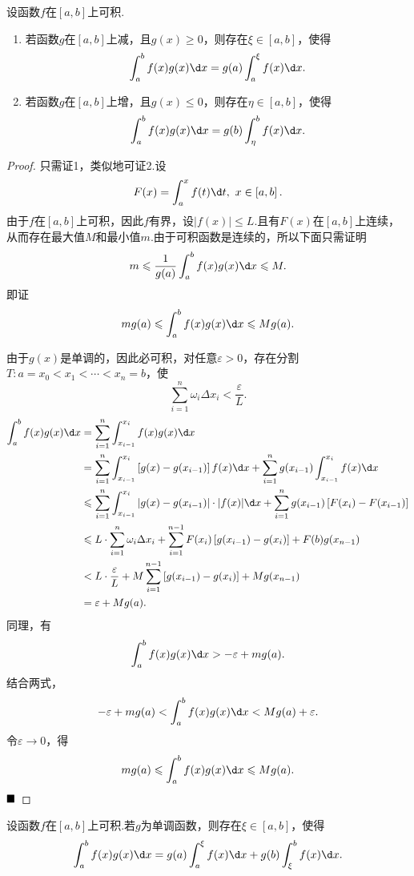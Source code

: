 \begin{theorem}[积分第二中值定理]
	设函数$f$在$\left[a,b\right]$上可积.
	\begin{enumerate}
		\item 若函数$g$在$\left[a,b\right]$上减，且$g(x)\geqslant 0$，则存在$\xi\in\left[a,b\right]$，使得
		$$\int_{a}^{b}f(x)g(x)\d x=g(a)\int_{a}^{\xi}f(x)\d x.$$
		\item 若函数$g$在$\left[a,b\right]$上增，且$g(x)\leqslant 0$，则存在$\eta\in\left[a,b\right]$，使得
		$$\int_{a}^{b}f(x)g(x)\d x=g(b)\int_{\eta}^{b}f(x)\d x.$$
	\end{enumerate}
\end{theorem}
\begin{proof}
	只需证1，类似地可证2.设
	$$F(x)=\int_{a}^{x}f(t)\d t,\ x\in\left[a,b\right].$$
	由于$f$在$\left[a,b\right]$上可积，因此$f$有界，设$|f(x)|\leqslant L$.且有$F(x)$在$\left[a,b\right]$上连续，从而存在最大值$M$和最小值$m$.由于可积函数是连续的，所以下面只需证明
	$$m\leqslant\frac{1}{g(a)}\int_{a}^{b}f(x)g(x)\d x\leqslant M.$$
	即证
	$$mg(a)\leqslant\int_{a}^{b}f(x)g(x)\d x\leqslant Mg(a).$$
	
	由于$g(x)$是单调的，因此必可积，对任意$\varepsilon>0$，存在分割$T:a=x_0<x_1<\cdots<x_n=b$，使
	$$\sum_{i=1}^{n}\omega_i\Delta x_i<\frac{\varepsilon}{L}.$$
	\begin{align*}
		\int_{a}^{b}f(x)g(x)\d x
		&=\sum_{i=1}^{n}\int_{x_{i-1}}^{x_i}f(x)g(x)\d x\\
		&=\sum_{i=1}^{n}\int_{x_{i-1}}^{x_i}\left[g(x)-g(x_{i-1})\right]f(x)\d x+\sum_{i=1}^{n}g(x_{i-1})\int_{x_{i-1}}^{x_i}f(x)\d x\\
		&\leqslant\sum_{i=1}^{n}\int_{x_{i-1}}^{x_i}\left|g(x)-g(x_{i-1})\right|\cdot|f(x)|\d x+\sum_{i=1}^{n}g(x_{i-1})\left[F(x_i)-F(x_{i-1})\right]\\
		&\leqslant L\cdot\sum_{i=1}^{n}\omega_i\Delta x_i+\sum_{i=1}^{n-1}F(x_i)\left[g(x_{i-1})-g(x_i)\right]+F(b)g(x_{n-1})\\
		&<L\cdot\frac{\varepsilon}{L}+M\sum_{i=1}^{n-1}\left[g(x_{i-1})-g(x_i)\right]+Mg(x_{n-1})\\
		&=\varepsilon+Mg(a).
	\end{align*}
	同理，有
	$$\int_{a}^{b}f(x)g(x)\d x>-\varepsilon+mg(a).$$
	结合两式，
	$$-\varepsilon+mg(a)<\int_{a}^{b}f(x)g(x)\d x<Mg(a)+\varepsilon.$$
	令$\varepsilon\to 0$，得
	$$mg(a)\leqslant\int_{a}^{b}f(x)g(x)\d x\leqslant Mg(a).$$
	$\hfill\blacksquare$
\end{proof}
\begin{corollary}
	设函数$f$在$\left[a,b\right]$上可积.若$g$为单调函数，则存在$\xi\in\left[a,b\right]$，使得
	$$\int_{a}^{b}f(x)g(x)\d x=g(a)\int_{a}^{\xi}f(x)\d x+g(b)\int_{\xi}^{b}f(x)\d x.$$
\end{corollary}
